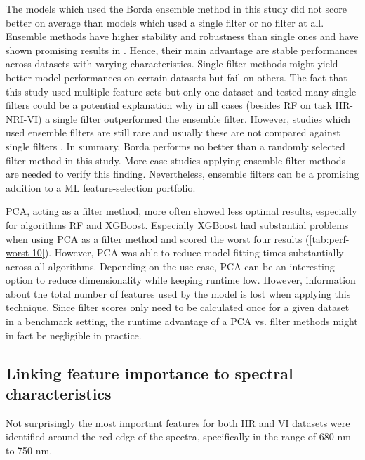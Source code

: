 \documentclass[journal]{IEEEtran}
\begin{document}
The models which used the Borda ensemble method in this study did not score better on average than models which used a single filter or no filter at all.
Ensemble methods have higher stability and robustness than single ones and have shown promising results in \cite{drotar2017a}.
Hence, their main advantage are stable performances across datasets with varying characteristics.
Single filter methods might yield better model performances on certain datasets but fail on others.
The fact that this study used multiple feature sets but only one dataset and tested many single filters could be a potential explanation why in all cases (besides RF on task HR-NRI-VI) a single filter outperformed the ensemble filter.
However, studies which used ensemble filters are still rare and usually these are not compared against single filters \cite{ghosh2019}.
In summary, Borda performs no better than a randomly selected filter method in this study.
More case studies applying ensemble filter methods are needed to verify this finding.
Nevertheless, ensemble filters can be a promising addition to a ML feature-selection portfolio.

PCA, acting as a filter method, more often showed less optimal results, especially for algorithms RF and XGBoost.
Especially XGBoost had substantial problems when using PCA as a filter method and scored the worst four results (\autoref{tab:perf-worst-10}).
However, PCA was able to reduce model fitting times substantially across all algorithms.
Depending on the use case, PCA can be an interesting option to reduce dimensionality while keeping runtime low.
However, information about the total number of features used by the model is lost when applying this technique.
Since filter scores only need to be calculated once for a given dataset in a benchmark setting, the runtime advantage of a PCA vs. filter methods might in fact be negligible in practice.

\subsection{Linking feature importance to spectral characteristics}

Not surprisingly the most important features for both HR and VI datasets were identified around the red edge of the spectra, specifically in the range of 680 nm to 750 nm.
\end{document}
